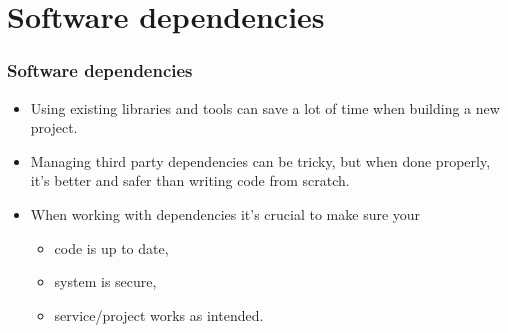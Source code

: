 \documentclass[aspectratio=169]{beamer}              %
\begin{document}
\section{Software dependencies}

\begin{frame}
	\frametitle{Software dependencies}
	
	\begin{block}{}
		\begin{itemize}
			\item Using existing libraries and tools can save a lot of time when building a new project.
			\item Managing third party dependencies can be tricky, but when done properly, it's better and safer than writing code from scratch.
			\item When working with dependencies it's crucial to make sure your
			\begin{itemize}
				\item code is up to date,
				\item system is secure,
				\item service/project works as intended.
			\end{itemize}
		\end{itemize}
	\end{block}


\end{frame}
\end{document}
